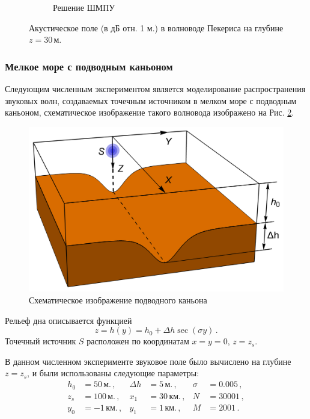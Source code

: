 \documentclass{fefu}
\newcommand{\pa}[1]{\left(#1\right)}
\begin{document}
\begin{figure}[h]
\begin{subfigure}[t]{0.49\linewidth}
                        \caption{Решение ШМПУ}
                    \end{subfigure}
                    \caption{\label{fig::pekeris}Акустическое поле (в дБ отн. 1 м.) в волноводе Пекериса на глубине $z=30\,\text{м.}$}
                \end{figure}
            \newpage
            \subsubsection{Мелкое море с подводным каньоном}
                \par Следующим численным экспериментом является моделирование распространения звуковых волн, создаваемых точечным источником в мелком море с подводным каньоном, схематическое изображение такого волновода изображено на Рис. \ref{fig::canyon}.
                \begin{figure}[h]
                    \centering
                    \includegraphics[scale=0.2]{canyon}
                    \caption{\label{fig::canyon}Схематическое изображение подводного каньона}
                \end{figure}
                Рельеф дна описывается функцией
                \begin{equation}
                    z=h\pa{y}=h_0+\Delta h\sec\pa{\sigma y}\,.
                \end{equation}
                Точечный источник $S$ расположен по координатам $x=y=0$, $z=z_s$.
                \newpage
                \par В данном численном эксперименте звуковое поле было вычислено на глубине $z=z_s$, и были использованы следующие параметры:
                \begin{equation}
                    \begin{aligned}
                        h_0&=50\,\text{м.}\,,&\Delta h&=5\,\text{м.}\,,&\sigma&=0.005\,,\\
                        z_s&=100\,\text{м.}\,,&x_1&=30\,\text{км.}\,,&N&=30001\,,\\
                        y_0&=-1\,\text{км.}\,,&y_1&=1\,\text{км.}\,,&M&=2001\,.
                    \end{aligned}
                \end{equation}
\end{document}

